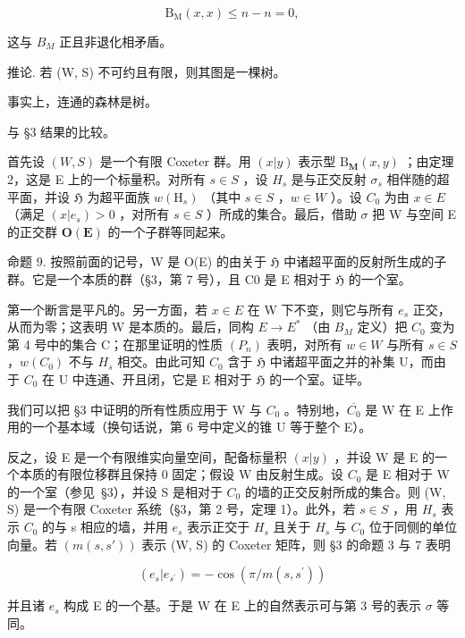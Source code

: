 \[
\mathrm{B} _ {\mathrm{M}} (x, x) \leqslant n - n = 0,
\]

这与 \(B_{M}\) 正且非退化相矛盾。

推论. 若 (W, S) 不可约且有限，则其图是一棵树。

事实上，连通的森林是树。

与 §3 结果的比较。

首先设 \((W,S)\) 是一个有限 Coxeter 群。用 \((x|y)\) 表示型 \(\mathrm{B}_{\mathbf{M}}(x,y)\) ；由定理 2，这是 E 上的一个标量积。对所有 \(s \in S\) ，设 \(H_{s}\) 是与正交反射 \(\sigma_{s}\) 相伴随的超平面，并设 \(\mathfrak{H}\) 为超平面族 \(w(\mathrm{H}_{s})\) （其中 \(s \in S\) ，\(w \in W\) ）。设 \(C_{0}\) 为由 \(x \in E\) （满足 \((x|e_{s}) > 0\) ，对所有 \(s \in S\) ）所成的集合。最后，借助 \(\sigma\) 把 W 与空间 E 的正交群 \(\mathbf{O}(\mathbf{E})\) 的一个子群等同起来。

命题 9. 按照前面的记号，W 是 O(E) 的由关于 \(\mathfrak{H}\) 中诸超平面的反射所生成的子群。它是一个本质的群（§3，第 7 号），且 C0 是 E 相对于 \(\mathfrak{H}\) 的一个室。

第一个断言是平凡的。另一方面，若 \(x \in E\) 在 W 下不变，则它与所有 \(e_{s}\) 正交，从而为零；这表明 W 是本质的。最后，同构 \(E \to E^{*}\) （由 \(B_{M}\) 定义）把 \(C_{0}\) 变为第 4 号中的集合 C；在那里证明的性质 \((P_{n})\) 表明，对所有 \(w \in W\) 与所有 \(s \in S\) ，\(w(C_0)\) 不与 \(H_s\) 相交。由此可知 \(C_0\) 含于 \(\mathfrak{H}\) 中诸超平面之并的补集 U，而由于 \(C_0\) 在 U 中连通、开且闭，它是 E 相对于 \(\mathfrak{H}\) 的一个室。证毕。

我们可以把 §3 中证明的所有性质应用于 W 与 \(C_{0}\) 。特别地，\(\overline{C_{0}}\) 是 W 在 E 上作用的一个基本域（换句话说，第 6 号中定义的锥 U 等于整个 E）。

反之，设 E 是一个有限维实向量空间，配备标量积 \((x|y)\) ，并设 W 是 E 的一个本质的有限位移群且保持 0 固定；假设 W 由反射生成。设 \(C_{0}\) 是 E 相对于 W 的一个室（参见~§3），并设 S 是相对于 \(C_{0}\) 的墙的正交反射所成的集合。则 (W, S) 是一个有限 Coxeter 系统（§3，第 2 号，定理 1）。此外，若 \(s \in S\) ，用 \(H_{s}\) 表示 \(C_{0}\) 的与 s 相应的墙，并用 \(e_{s}\) 表示正交于 \(H_{s}\) 且关于 \(H_{s}\) 与 \(C_{0}\) 位于同侧的单位向量。若 \((m(s, s'))\) 表示 (W, S) 的 Coxeter 矩阵，则 §3 的命题 3 与 7 表明

\[
(e _ {s} | e _ {s ^ {\prime}}) = - \cos (\pi / m (s, s ^ {\prime}))
\]

并且诸 \(e_{s}\) 构成 E 的一个基。于是 W 在 E 上的自然表示可与第 3 号的表示 \(\sigma\) 等同。

